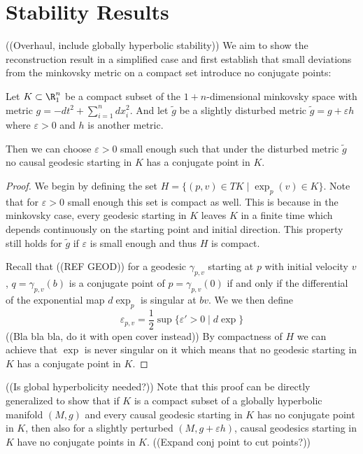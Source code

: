 \section{Stability Results}
((Overhaul, include globally hyperbolic stability))
We aim to show the reconstruction result in a simplified case and first establish that small deviations from the minkovsky metric on a compact set introduce no conjugate points:
\begin{proposition}
Let $K\subset\R^n_1$ be a compact subset of the $1+n$-dimensional minkovsky space with metric $g=-dt^2+\sum_{i=1}^n dx_i^2$. And let $\widetilde{g}$ be a slightly disturbed metric $\widetilde{g}=g+\varepsilon h$ where $\varepsilon>0$ and $h$ is another metric.

Then we can choose $\varepsilon>0$ small enough such that under the disturbed metric $\widetilde{g}$ no causal geodesic starting in $K$ has a conjugate point in $K$.
\end{proposition}
\begin{proof}
We begin by defining the set $H = \{(p,v)\in TK \mid \exp_p(v) \in K\}$. Note that for $\varepsilon>0$ small enough this set is compact as well. This is because in the minkovsky case, every geodesic starting in $K$ leaves $K$ in a finite time which depends continuously on the starting point and initial direction. This property still holds for $\widetilde{g}$ if $\varepsilon$ is small enough and thus $H$ is compact.

Recall that ((REF GEOD)) for a geodesic $\gamma_{p,v}$ starting at $p$ with initial velocity $v$, $q=\gamma_{p,v}(b)$ is a conjugate point of $p=\gamma_{p,v}(0)$ if and only if the differential of the exponential map $d\exp_p$ is singular at $bv$. 
We we then define 
\[
    \varepsilon_{p,v} = \frac{1}{2}\sup\{\varepsilon'>0\mid d\exp\}
\]((Bla bla bla, do it with open cover instead))
By compactness of $H$ we can achieve that $\exp$ is never singular on it which means that no geodesic starting in $K$ has a conjugate point in $K$. 
\end{proof}
((Is global hyperbolicity needed?))
Note that this proof can be directly generalized to show that if $K$ is a compact subset of a globally hyperbolic manifold $(M,g)$ and every causal geodesic starting in $K$ has no conjugate point in $K$, then also for a slightly perturbed $(M,g+\varepsilon h)$, causal geodesics starting in $K$ have no conjugate points in $K$.
((Expand conj point to cut points?))
